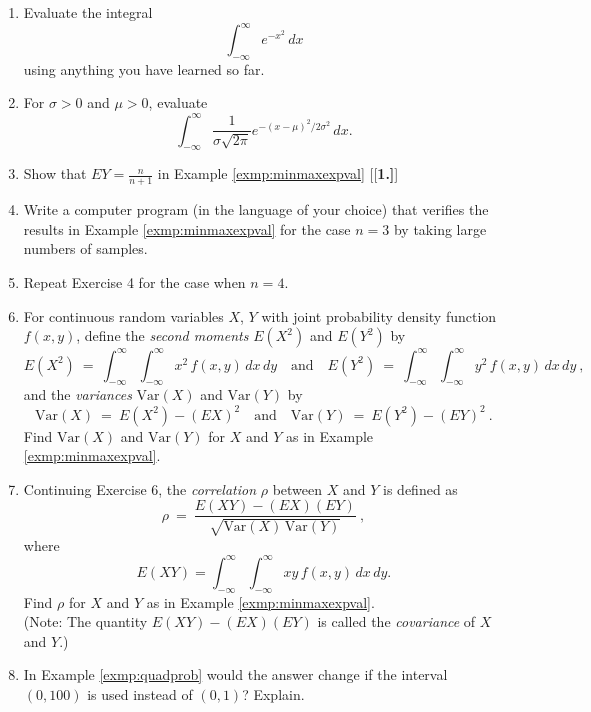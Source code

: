 \startexercises\label{sec3dot7}
\begin{enumerate}[\bfseries 1.]
 \item Evaluate the integral \[\int_{-\infty}^{\infty} e^{-x^2}\,dx\] using anything you have learned so far.
 \item For $\sigma > 0$ and $\mu > 0$, evaluate \[\int_{-\infty}^{\infty} \frac{1}{\sigma \sqrt{2\pi}}
  e^{-(x-\mu)^2 /2\sigma^2 } \,dx.\]
 \item Show that $EY = \frac{n}{n+1}$ in Example \ref{exmp:minmaxexpval}
[{[\bfseries 1.]}]
 \item Write a computer program (in the language of your choice) that verifies the results in Example
 \ref{exmp:minmaxexpval} for the case $n=3$ by taking large numbers of samples.
 \item Repeat Exercise 4 for the case when $n=4$.
 
 \item For continuous random variables $X$, $Y$ with joint probability density function $f(x,y)$, define the \emph{second moments}
  $E(X^2 )$ and $E(Y^2 )$ by
  \begin{displaymath}
   E(X^2 ) ~=~ \int_{-\infty}^{\infty} \int_{-\infty}^{\infty} x^2 \,f(x,y)\,dx\,dy \quad\text{and}\quad
   E(Y^2 ) ~=~ \int_{-\infty}^{\infty} \int_{-\infty}^{\infty} y^2 \,f(x,y)\,dx\,dy ~,
  \end{displaymath}
  and the \emph{variances} $\text{Var}(X)$ and $\text{Var}(Y)$ by
  \begin{displaymath}
   \text{Var}(X) ~=~ E(X^2 ) - (EX)^2 \quad\text{and}\quad \text{Var}(Y) ~=~ E(Y^2 ) - (EY)^2 ~.
  \end{displaymath}
  Find $\text{Var}(X)$ and $\text{Var}(Y)$ for $X$ and $Y$ as in Example \ref{exmp:minmaxexpval}.
 \item Continuing Exercise 6, the \emph{correlation} $\rho$ between $X$ and $Y$ is defined as
  \begin{displaymath}
   \rho ~=~ \frac{E(XY) - (EX)(EY)}{\sqrt{\text{Var}(X)\,\text{Var}(Y)}} ~,
  \end{displaymath}
  where \[E(XY) = \int_{-\infty}^{\infty} \int_{-\infty}^{\infty}xy \,f(x,y)\,dx\,dy.\] 
  Find $\rho$ for
  $X$ and $Y$ as in Example \ref{exmp:minmaxexpval}.\\(Note: The quantity $E(XY) - (EX)(EY)$ is called the
  \emph{covariance} of $X$ and $Y$.)
 \item In Example \ref{exmp:quadprob} would the answer change if the interval $(0,100)$ is used instead of
  $(0,1)$? Explain.
\end{enumerate}
